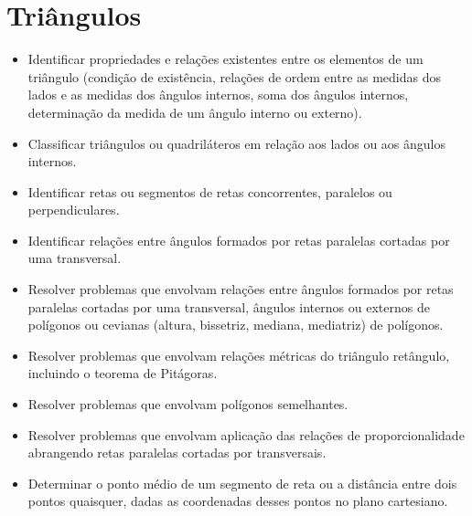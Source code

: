 
\chapter{Triângulos}

\begin{itemize}
\item Identificar propriedades e relações existentes
entre os elementos de um triângulo (condição de existência, relações de
ordem entre as medidas dos lados e as medidas dos ângulos internos, soma
dos ângulos internos, determinação da medida de um ângulo interno ou
externo).
\item
  Classificar triângulos ou quadriláteros em relação aos lados ou aos
  ângulos internos.
\item
  Identificar retas ou segmentos de retas concorrentes, paralelos ou
  perpendiculares.
\item
  Identificar relações entre ângulos formados por retas paralelas
  cortadas por uma transversal.
\item
  Resolver problemas que envolvam relações entre ângulos formados por
  retas paralelas cortadas por uma transversal, ângulos internos ou
  externos de polígonos ou cevianas (altura, bissetriz, mediana,
  mediatriz) de polígonos.
\item
  Resolver problemas que envolvam relações métricas do triângulo
  retângulo, incluindo o teorema de Pitágoras.
\item
  Resolver problemas que envolvam polígonos semelhantes.
\item
  Resolver problemas que envolvam aplicação das relações de
  proporcionalidade abrangendo retas paralelas cortadas por
  transversais.
\item
  Determinar o ponto médio de um segmento de reta ou a distância entre
  dois pontos quaisquer, dadas as coordenadas desses pontos no plano
  cartesiano.
\end{itemize}


